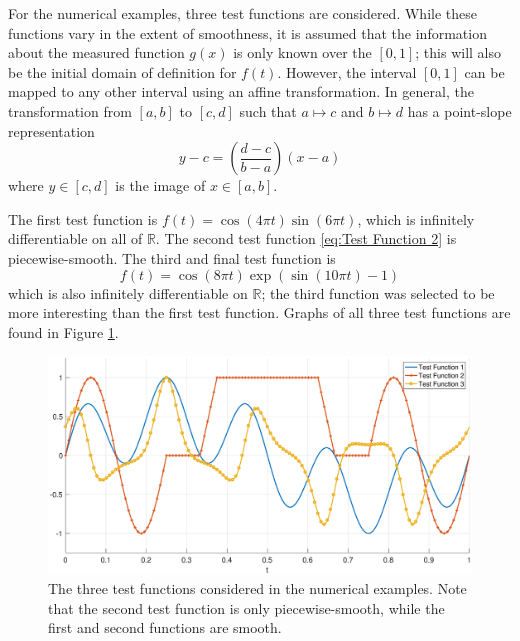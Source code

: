 \documentclass[12pt,notitlepage]{report}
\begin{document}
For the numerical examples, three test functions are considered. While these functions vary in the extent of smoothness, it is assumed that the information about the measured function $g(x)$ is only known over the $[0,1]$; this will also be the initial domain of definition for $f(t)$. However, the interval $[0,1]$ can be mapped to any other interval using an affine transformation. In general, the transformation from $[a,b]$ to $[c,d]$ such that $a \mapsto c$ and $b \mapsto d$ has a point-slope representation
\[y - c = \left(\frac{d-c}{b-a}\right)(x - a)\]
where $y \in [c,d]$ is the image of $x \in [a,b]$. \par
The first test function is $f(t) = \cos(4\pi{t})\sin(6\pi{t})$, which is infinitely differentiable on all of $\mathbb{R}$. The second test function \eqref{eq:Test Function 2} is piecewise-smooth. The third and final test function is
\begin{equation}
f(t) = \cos(8\pi{t})\exp(\sin(10\pi{t})-1)
\label{eq:Test Function 3}
\end{equation}
which is also infinitely differentiable on $\mathbb{R}$; the third function was selected to be more interesting than the first test function. Graphs of all three test functions are found in Figure \ref{TestFunctions}.  \par

\begin{figure}
	\centerline{\includegraphics[scale = 0.45]{Figures/TestFunctions1D.eps}}
\caption{The three test functions considered in the numerical examples. Note that the second test function is only piecewise-smooth, while the first and second functions are smooth.}
\label{TestFunctions}
\end{figure}
\end{document}
